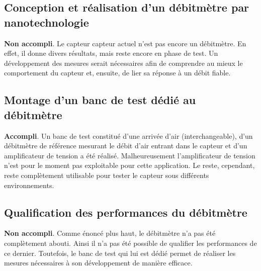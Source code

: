 \subsection{Conception et réalisation d'un débitmètre par nanotechnologie}
\textbf{Non accompli}. Le capteur \gls{capteur} actuel n'est pas encore un débitmètre. En effet, il donne divers résultats, mais reste encore en 
phase de test. Un développement des mesures serait nécessaires afin de comprendre au mieux le comportement du capteur et, ensuite, de lier 
sa réponse à un débit fiable. 


\subsection{Montage d'un banc de test dédié au débitmètre}
\textbf{Accompli}. Un banc de test constitué d'une arrivée d'air (interchangeable), d'un débitmètre de référence mesurant le débit d'air entrant 
dans le capteur et d'un amplificateur de tension a été réalisé. Malheureusement l'amplificateur de tension n'est pour le moment pas exploitable 
pour cette application. Le reste, cependant, reste complètement utilisable pour tester le capteur sous différents environnements. 

\subsection{Qualification des performances du débitmètre}
\textbf{Non accompli}. Comme énoncé plus haut, le débitmètre n'a pas été complètement abouti. Ainsi il n'a pas été possible de qualifier les 
performances de ce dernier. Toutefois, le banc de test qui lui est dédié permet de réaliser les mesures nécessaires à son développement de manière 
efficace. 


